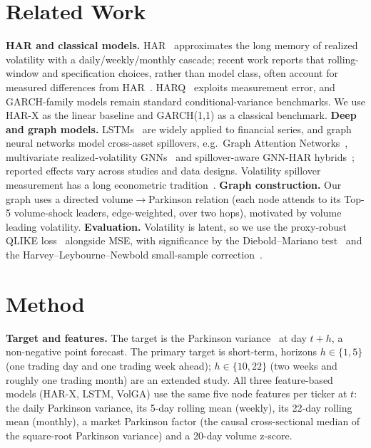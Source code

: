 \documentclass[runningheads]{llncs}
\begin{document}
\section{Related Work}
\textbf{HAR and classical models.} HAR~\cite{corsi2009} approximates the long memory of realized volatility
with a daily/weekly/monthly cascade; recent work reports that rolling-window and specification choices, rather
than model class, often account for measured differences from HAR~\cite{audrino2025}. HARQ~\cite{harq2016}
exploits measurement error, and GARCH-family models remain standard conditional-variance benchmarks. We use
HAR-X as the linear baseline and GARCH(1,1) as a classical benchmark. \textbf{Deep and graph models.} LSTMs~\cite{lstm1997} are widely applied to
financial series, and graph neural networks model cross-asset spillovers, e.g.\ Graph Attention
Networks~\cite{gat2018}, multivariate realized-volatility GNNs~\cite{chen2022} and spillover-aware GNN-HAR
hybrids~\cite{gnnhar2025}; reported effects vary across studies and data designs. Volatility spillover
measurement has a long econometric tradition~\cite{dy2012}. \textbf{Graph construction.} Our graph uses a
directed volume$\to$Parkinson relation (each node attends to its Top-5 volume-shock leaders, edge-weighted,
over two hops), motivated by volume leading volatility. \textbf{Evaluation.} Volatility is latent, so we use
the proxy-robust QLIKE loss~\cite{patton2011} alongside MSE, with significance by the Diebold--Mariano
test~\cite{dm1995} and the Harvey--Leybourne--Newbold small-sample correction~\cite{hln1997}.

\section{Method}
\textbf{Target and features.} The target is the Parkinson variance~\cite{parkinson1980} at day $t{+}h$, a
non-negative point forecast. The primary target is short-term, horizons $h\in\{1,5\}$ (one trading day and one
trading week ahead); $h\in\{10,22\}$ (two weeks and roughly one trading month) are an extended study. All
three feature-based models (HAR-X, LSTM, VolGA) use the same five node features per ticker at $t$: the daily Parkinson variance, its 5-day
rolling mean (weekly), its 22-day rolling mean (monthly), a market Parkinson factor (the causal cross-sectional
median of the square-root Parkinson variance) and a 20-day volume z-score.
\end{document}
